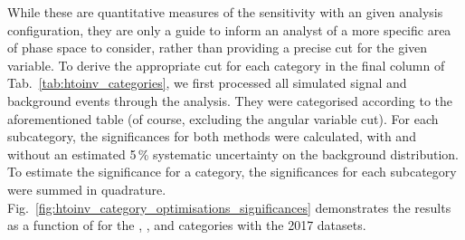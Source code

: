 While these are quantitative measures of the sensitivity with an given analysis configuration, they are only a guide to inform an analyst of a more specific area of phase space to consider, rather than providing a precise cut for the given variable. To derive the appropriate cut for each category in the final column of Tab.~\ref{tab:htoinv_categories}, we first processed all simulated signal and background events through the analysis. They were categorised according to the aforementioned table (of course, excluding the angular variable cut). For each subcategory, the significances for both methods were calculated, with and without an estimated 5\,\% systematic uncertainty on the background distribution. To estimate the significance for a category, the significances for each subcategory were summed in quadrature. Fig.~\ref{fig:htoinv_category_optimisations_significances} demonstrates the results as a function of \omegaTilde for the \ttH, \VH, and \ggF categories with the 2017 datasets.

